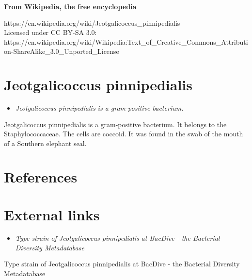 \textbf{From Wikipedia, the free encyclopedia}

https://en.wikipedia.org/wiki/Jeotgalicoccus\_pinnipedialis\\
Licensed under CC BY-SA 3.0:\\
https://en.wikipedia.org/wiki/Wikipedia:Text\_of\_Creative\_Commons\_Attribution-ShareAlike\_3.0\_Unported\_License

\section{Jeotgalicoccus
pinnipedialis}\label{jeotgalicoccus-pinnipedialis}

\begin{itemize}
\item
  \emph{Jeotgalicoccus pinnipedialis is a gram-positive bacterium.}
\end{itemize}

Jeotgalicoccus pinnipedialis is a gram-positive bacterium. It belongs to
the Staphylococcaceae. The cells are coccoid. It was found in the swab
of the mouth of a Southern elephant seal.

\section{References}\label{references}

\section{External links}\label{external-links}

\begin{itemize}
\item
  \emph{Type strain of Jeotgalicoccus pinnipedialis at BacDive - the
  Bacterial Diversity Metadatabase}
\end{itemize}

Type strain of Jeotgalicoccus pinnipedialis at BacDive - the Bacterial
Diversity Metadatabase
